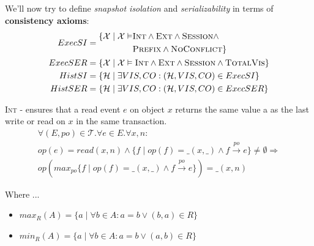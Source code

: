 \documentclass{beamer}
\begin{document}
\begin{frame}
	We'll now try to define \emph{snapshot isolation} and \emph{serializability} in terms of \textbf{consistency axioms}:
	\begin{equation*}
		\begin{aligned}
			ExecSI = {} &
				\begin{aligned} 
					\{ \mathcal{X} \mid \mathcal{X} \vDash & \textsc{Int} \wedge \textsc{Ext} \wedge \textsc{Session} \wedge \\
														& \textsc{Prefix} \wedge \textsc{NoConflict} \}
				\end{aligned}
				\\
			ExecSER = {} & \{ \mathcal{X} \mid \mathcal{X} \vDash \textsc{Int} \wedge \textsc{Ext} \wedge \textsc{Session} \wedge \textsc{TotalVis} \} \\
			HistSI = {} & \{ \mathcal{H} \mid \exists VIS,CO : (\mathcal{H}, VIS, CO) \in ExecSI \} \\
			HistSER = {} & \{ \mathcal{H} \mid \exists VIS,CO : (\mathcal{H}, VIS, CO) \in ExecSER \} 
		\end{aligned}
	\end{equation*}
\end{frame}

\begin{frame}
	\begin{definition}
		\textsc{Int} - ensures that a read event $e$ on object $x$ returns the same value a as the last write or read on $x$ in the same transaction.
		\begin{multline*}
			\forall (E,po)\in \mathcal{T} . \forall e \in E . \forall x,n: \\
				op(e) = read(x,n) \wedge \{f\mid op(f) = \_(x,\_)\wedge f \xrightarrow{po} e\} \ne \emptyset \Rightarrow \\
				op\left(max_{po}\{f \mid op\left(f\right) = \_ \left(x, \_\right) \wedge f \xrightarrow{po} e\}\right) = \_(x,n)
		\end{multline*}
	\end{definition}
	Where ...
	\begin{itemize}
		\item $max_R(A) = \{ a \mid \forall b \in A: a = b \vee (b, a) \in R \} $
		\item $min_R(A) = \{ a \mid \forall b \in A: a = b \vee (a, b) \in R \} $
	\end{itemize}
\end{frame}
\end{document}
